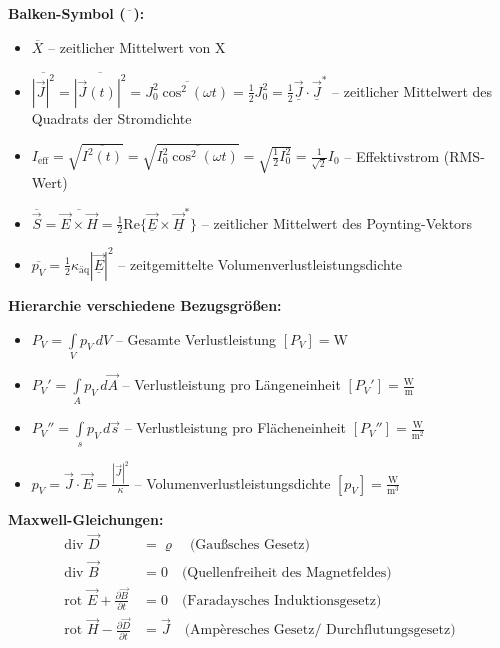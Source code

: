 \textbf{Balken-Symbol ($\overline{\phantom{x}}$):}
\begin{itemize}
\item $\overline{X}$ -- zeitlicher Mittelwert von X
\item $\overline{|\vec{J}|^2} = \overline{|\vec{J}(t)|^2} = \overline{J_0^2 \cos^2(\omega t)} = \frac{1}{2}J_0^2 = \frac{1}{2}\underline{\vec{J}} \cdot \underline{\vec{J}}^*$ -- zeitlicher Mittelwert des Quadrats der Stromdichte
\item $I_{\text{eff}} = \sqrt{\overline{I^2(t)}} = \sqrt{\overline{I_0^2 \cos^2(\omega t)}} = \sqrt{\frac{1}{2}I_0^2} = \frac{1}{\sqrt{2}}I_0$ -- Effektivstrom (RMS-Wert)
\item $\overline{\vec{S}} = \overline{\vec{E} \times \vec{H}} = \frac{1}{2}\text{Re}\{\underline{\vec{E}} \times \underline{\vec{H}}^*\}$ -- zeitlicher Mittelwert des Poynting-Vektors
\item $\overline{p_V} = \frac{1}{2}\kappa_{\text{äq}}|\underline{\vec{E}}|^2$ -- zeitgemittelte Volumenverlustleistungsdichte
\end{itemize}


\textbf{Hierarchie verschiedene Bezugsgrößen:}
\begin{itemize}
\item $P_V = \int\limits_V p_V \, dV$ -- Gesamte Verlustleistung \hfill $[P_V] = \text{W}$
\item $P_V' = \int\limits_A p_V \, d\vec{A}$ -- Verlustleistung pro Längeneinheit \hfill $[P_V'] = \frac{\text{W}}{\text{m}}$
\item $P_V'' = \int\limits_s p_V \, d\vec{s}$ -- Verlustleistung pro Flächeneinheit \hfill $[P_V''] = \frac{\text{W}}{\text{m}^2}$
\item $p_V = \vec{J} \cdot \vec{E} = \frac{|\vec{J}|^2}{\kappa}$ -- Volumenverlustleistungsdichte \hfill $[p_V] = \frac{\text{W}}{\text{m}^3}$
\end{itemize}


\textbf{Maxwell-Gleichungen:}
\begin{align}
\text{div } \vec{D} &= \varrho \quad \text{(Gaußsches Gesetz)} \\
\text{div } \vec{B} &= 0 \quad \text{(Quellenfreiheit des Magnetfeldes)} \\
\text{rot } \vec{E} + \frac{\partial \vec{B}}{\partial t} &= 0 \quad \text{(Faradaysches Induktionsgesetz)} \\
\text{rot } \vec{H} - \frac{\partial \vec{D}}{\partial t} &= \vec{J} \quad \text{(Ampèresches Gesetz/ Durchflutungsgesetz)}
\end{align}

